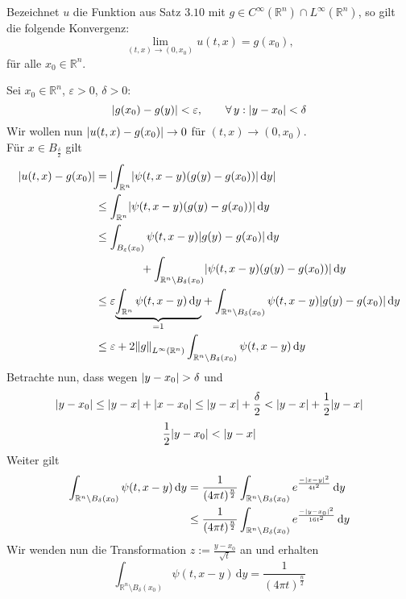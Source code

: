 \begin{satz}
	Bezeichnet $u$ die Funktion aus Satz $3.10$ mit $g \in C^{\infty}(\mathbb{R}^n) \cap L^{\infty}(\mathbb{R}^n)$, so gilt die folgende Konvergenz:
	\[
		\lim_{(t,x) \to (0,x_0)} u(t,x)=g(x_0), 
	\]
	für alle $x_0 \in \mathbb{R}^n$.
\end{satz}
\begin{beweis}
	Sei $x_0 \in \mathbb{R}^n$, $\varepsilon >0$, $\delta >0$:
	\[
		\lvert g(x_0)-g(y)\rvert < \varepsilon, \qquad \forall\, y: \lvert y-x_0\rvert < \delta 
	\]
	Wir wollen nun $\lvert u(t,x)-g(x_0)\rvert \to 0$ für $(t,x) \to (0,x_0)$. \\
	Für $x \in B_{\frac{\delta }{2}}$ gilt
	\begin{align*}
		\abs{u(t,x)-g(x_0)} &= \abs{\int_{\mathbb{R}^n}^{} \abs{\psi(t,x-y)(g(y)-g(x_0))} \,\mathrm{d}y} \\
		&\leq \int_{\mathbb{R}^n}^{} \abs{\psi(t,x-y)(g(y)-g(x_0))} \,\mathrm{d}y \\
		&\leq \int_{B_{\varepsilon}(x_0)}^{} \psi(t,x-y) \abs{g(y)-g(x_0)} \,\mathrm{d}y \\
		& \qquad \qquad + \int_{\mathbb{R}^n \setminus B_{\delta }(x_0)}^{} \abs{ \psi(t,x-y) (g(y)-g(x_0))} \,\mathrm{d}y \\
		& \leq \varepsilon \underset{=1}{\underbrace{\int_{\mathbb{R}^n}^{} \psi(t,x-y) \,\mathrm{d}y}} 
		+ \int_{\mathbb{R}^n \setminus B_{\delta }(x_0)}^{} \psi(t,x-y)\abs{g(y)-g(x_0)} \,\mathrm{d}y \\
		&\leq  \varepsilon + 2 \norm{g}_{L^{\infty}(\mathbb{R}^n)} \int_{\mathbb{R}^n \setminus B_{\delta }(x_0)}^{} \psi(t,x-y) \,\mathrm{d}y
	\end{align*}
	Betrachte nun, dass wegen $\lvert y-x_0\rvert > \delta$ und 
	\[
		\lvert y-x_0\rvert \leq \lvert y-x\rvert + \lvert x-x_0\rvert \leq \lvert y-x\rvert+ \frac{\delta }{2} < \lvert y-x\rvert + \frac{1}{2}\lvert y-x\rvert
	\]
	\[
		\frac{1}{2} \lvert y-x_0\rvert< \lvert y-x\rvert
	\]
	Weiter gilt
	\begin{align*}
		\int_{\mathbb{R}^n \setminus B_{\delta }(x_0)}^{} \psi(t,x-y) \,\mathrm{d}y 
		&= \frac{1}{(4 \pi t)^{\frac{n}{2}}} \int_{\mathbb{R}^n \setminus B_{\delta }(x_0)} e^{\frac{-\lvert x-y\rvert^2}{4t^2}} \,\mathrm{d}y \\
		&\leq \frac{1}{(4 \pi t)^{\frac{n}{2}}} \int_{\mathbb{R}^n \setminus B_{\delta }(x_0)}^{} e^{\frac{-\lvert y-x_0\rvert^2}{16t^2}} \,\mathrm{d}y
	\end{align*}
	Wir wenden nun die Transformation $z:= \frac{y-x_0}{\sqrt{t}}$ an und erhalten
	\[
		\int_{\mathbb{R}^n \setminus B_{\delta }(x_0)}^{} \psi(t,x-y) \,\mathrm{d}y= \frac{1}{(4 \pi t)^{\frac{n}{2}}} 
\]
\end{beweis}
